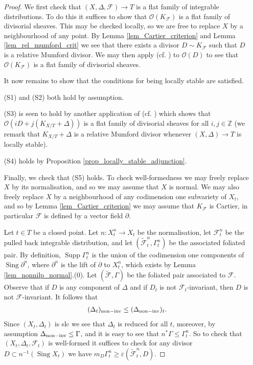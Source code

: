 \documentclass[12pt, a4paper]{amsart}
\DeclareMathOperator{\sing}{Sing}
\DeclareMathOperator{\supp}{Supp}
\newcounter{Theorem}
\theoremstyle{definition}
\theoremstyle{named}
\begin{document}
\begin{proof}
We first check that $(X, \Delta, \mathcal F) \to T$ is a flat family of integrable distributions. 
 To do this it suffices to show that $\mathcal O(K_{\mathcal F})$ is a flat family of divisorial sheaves.
This may be checked locally, so we are free to replace 
$X$ by a neighbourhood of any point.
By Lemma \ref{lem_Cartier_criterion} and Lemma \ref{lem_rel_mumford_crit}
we see that there exists a divisor $D \sim K_{\mathcal F}$
such that $D$ is a relative Mumford divisor.
We may then apply \cite[Proposition 2.79]{modbook} (cf. \cite[Theorem 7.20]{Kollar13}) to $\mathcal O(D)$ to see that $\mathcal O(K_{\mathcal F})$
is a flat family of divisorial sheaves.

It now remains to show that the conditions for being locally stable are satisfied.

(S1) and (S2) both hold by assumption. 

(S3) is seen to hold by another application of  \cite[Proposition 2.79]{modbook} (cf. \cite[Theorem 7.20]{Kollar13}) which shows that 
$\mathcal O(iD+j(K_{X/T}+\Delta))$ is a flat family of divisorial sheaves for all $i, j \in \mathbb Z$
(we remark that $K_{X/T}+\Delta$ is a relative Mumford divisor whenever $(X, \Delta) \rightarrow T$ is locally stable).

(S4) holds by
Proposition \ref{prop_locally_stable_adjunction}. 

Finally, we check that (S5) holds. To check well-formedness we may freely replace $X$ by its normalisation, and so we may assume that $X$ is normal.  We may also freely replace $X$ by a neighbourhood of any codimension one subvariety of $X_t$, 
and so by Lemma \ref{lem_Cartier_criterion} we may assume that $K_{\mathcal F}$
is Cartier, in particular $\mathcal F$ is defined by a vector field $\partial$.

Let $t \in T$ be a closed point. Let $n\colon X^n_t \to X_t$ be the normalisation, let $\mathcal F^n_t$
be the pulled back integrable distribution, and let $(\tilde{\mathcal F}^n_t, \Gamma^n_t)$ be the associated foliated pair.  By definition, $\supp \Gamma^n_t$
is the union of the codimension one components of $\sing \partial^n$, where $\partial^n$ is the lift of $\partial$ to $X^n_t$, which exists by Lemma \ref{lem_nonnilp_normal}.(0).
Let $(\tilde{\mathcal F}, \Gamma)$ be the foliated pair associated to $\mathcal F$.
Observe that if $D$ is any component of $\Delta$ and if $D_t$ is not
$\mathcal F_t$-invariant, then $D$ is not $\mathcal F$-invariant.
It follows that 
\begin{align*}(\Delta_t)_{{\rm non-inv}} \leq (\Delta_{{\rm non-inv}})_t.\end{align*}
Since $(X_t, \Delta_t)$ is slc we see that  $\Delta_t$ is reduced for all $t$, moreover, by assumption $\Delta_{{\rm non-inv}} \leq \Gamma$, and it is easy to see that $n^*\Gamma \leq \Gamma^n_t$. So to check 
that $(X_t, \Delta_t, \mathcal F_t)$ is well-formed it suffices to check for
any divisor $D \subset n^{-1}(\sing X_t)$ we have $m_D\Gamma^n_t \ge \varepsilon(\tilde{\mathcal F}^n_t, D)$.  


\end{proof}
\end{document}
